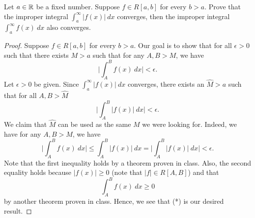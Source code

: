 \documentclass[a4paper]{article}
\begin{document}
\begin{problem}
    Let \( a \in \mathbb{R}  \) be a fixed number. Suppose \( f \in R[a,b] \) for every \(  b > a  \). Prove that the improper integral \( \int_{ a }^{ \infty  }  | f(x) |  \ dx   \) converges, then the improper integral \( \int_{ a }^{ \infty  }  f(x) \ dx   \) also converges. 
\end{problem}
\begin{proof}
    Suppose \( f \in R[a,b] \) for every \( b > a   \). Our goal is to show that for all \( \epsilon > 0  \) such that there exists \(  M > a  \) such that for any \( A,B > M  \), we have 
    \[  \Big| \int_{ A }^{ B } f(x) \ dx  \Big|  < \epsilon. \]
    Let \( \epsilon > 0  \) be given. Since \( \int_{ a }^{ \infty  } | f(x) |  \ dx   \) converges, there exists an \( \hat{M} > a  \)  such that for all \( A , B > \hat{M} \) 
    \[  \Big| \int_{ A }^{ B } | f(x) |  \ dx  \Big|  < \epsilon.  \]
    We claim that \( \hat{M} \) can be used as the same \( M  \) we were looking for. Indeed, we have for any \( A,B > M  \), we have  
    \[  \Big| \int_{ A }^{ B } f(x) \ dx  \Big| \leq \int_{ A }^{ B } | f(x) |  \ dx = \Big| \int_{ A }^{ B } | f(x) |  \ dx   \Big|  < \epsilon. \tag{*} \]
    Note that the first inequality holds by a theorem proven in class. Also, the second equality holds because \( | f(x) |  \geq 0  \) (note that \( | f | \in R[A,B] \)) and that 
    \[  \int_{ A }^{ B } f(x) \ dx \geq 0  \]
    by another theorem proven in class. Hence, we see that (*) is our desired result.
\end{proof}
\end{document}
